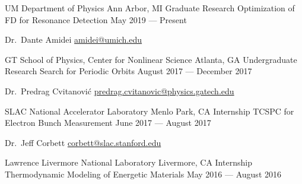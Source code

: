 
\begin{minipage}[t]{0.2\textwidth}
	\flushleft
\end{minipage}
\begin{minipage}[t]{0.8\textwidth}
  \organization
  {UM Department of Physics}
  {Ann Arbor, MI}
  {Graduate Research}
  {Optimization of FD for Resonance Detection}
  {May 2019 --- Present}


  {Dr.\ Dante Amidei}
  {\href{mailto:amidei@umich.edu}{amidei@umich.edu}}

  \vspace*{4pt}

  \organization
  {GT School of Physics, Center for Nonlinear Science}
  {Atlanta, GA}
  {Undergraduate Research}
  {Search for Periodic Orbits}
  {August 2017 --- December 2017}


  {Dr.\ Predrag Cvitanovi\'{c}}
  {\href{mailto:predrag.cvitanovic@physics.gatech.edu}{predrag.cvitanovic@physics.gatech.edu}}

  \vspace*{4pt}

  \organization
  {SLAC National Accelerator Laboratory}
  {Menlo Park, CA}
  {Internship}
  {TCSPC for Electron Bunch Measurement}
  {June 2017 --- August 2017}


  {Dr.\ Jeff Corbett}
  {\href{mailto:corbett@slac.stanford.edu}{corbett@slac.stanford.edu}}

  \vspace*{4pt}

  \organization
  {Lawrence Livermore National Laboratory}
  {Livermore, CA}
  {Internship}
  {Thermodynamic Modeling of Energetic Materials}
  {May 2016 --- August 2016}


\end{minipage}
